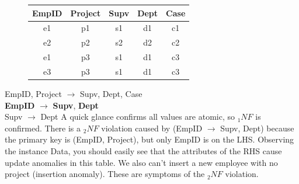 \documentclass{report}
\begin{document}
    \begin{figure}[H]
    \centering
    \setlength{\tabcolsep}{30}
    \begin{tabular}{c c c c c}
    \hline 
    EmpID & Project & Supv & Dept & Case \\
\hline
    e1 & p1 & s1 & d1 & c1 \\
    e2 & p2 & s2 & d2 & c2 \\
    e1 & p3 & s1 & d1 & c3 \\
    e3 & p3 & s1 & d1 & c3 \\
    \hline
    \end{tabular}
    \end{figure}
\bigbreak \noindent
EmpID, Project $\rightarrow$ Supv, Dept, Case \\
\textbf{EmpID} $\rightarrow$ \textbf{Supv}, \textbf{Dept} \\
Supv $\rightarrow$ Dept
\bigbreak \noindent
A quick glance confirms all values are atomic, so $_1NF$ is confirmed.
\bigbreak \noindent
There is a $_2NF$ violation caused by (EmpID $\rightarrow$ Supv, Dept) because the primary key is (EmpID, Project), but only EmpID is on the LHS.
\bigbreak \noindent
Observing the instance Data, you should easily see that the attributes of the RHS cause update anomalies in this table. We also can't insert a new employee with no project (insertion anomaly). These are symptoms of the $_2NF$ violation.
\end{document}

